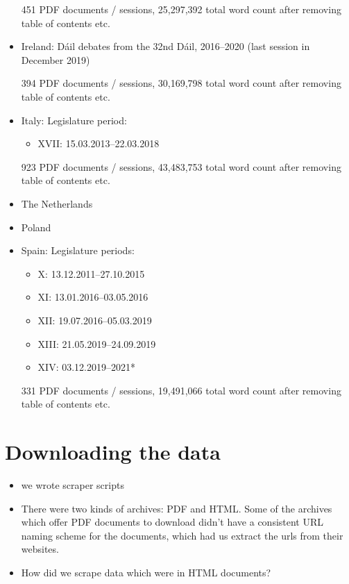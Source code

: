 \documentclass[
  12pt,
]{scrreprt}
\providecommand{\tightlist}{%
  \setlength{\itemsep}{0pt}\setlength{\parskip}{0pt}}
\begin{document}
\begin{itemize}
  451 PDF documents / sessions, 25,297,392 total word count after
  removing table of contents etc.
\item
  Ireland: Dáil debates from the 32nd Dáil, 2016--2020 (last session in
  December 2019)

  394 PDF documents / sessions, 30,169,798 total word count after
  removing table of contents etc.
\item
  Italy: Legislature period:

  \begin{itemize}
  \tightlist
  \item
    XVII: 15.03.2013--22.03.2018
  \end{itemize}

  923 PDF documents / sessions, 43,483,753 total word count after
  removing table of contents etc.
\item
  The Netherlands
\item
  Poland
\item
  Spain: Legislature periods:

  \begin{itemize}
  \tightlist
  \item
    X: 13.12.2011--27.10.2015
  \item
    XI: 13.01.2016--03.05.2016
  \item
    XII: 19.07.2016--05.03.2019
  \item
    XIII: 21.05.2019--24.09.2019
  \item
    XIV: 03.12.2019--2021*
  \end{itemize}

  331 PDF documents / sessions, 19,491,066 total word count after
  removing table of contents etc.
\end{itemize}

\hypertarget{downloading-the-data}{%
\section{Downloading the data}\label{downloading-the-data}}

\begin{itemize}
\tightlist
\item
  we wrote scraper scripts
\item
  There were two kinds of archives: PDF and HTML. Some of the archives
  which offer PDF documents to download didn't have a consistent URL
  naming scheme for the documents, which had us extract the urls from
  their websites.
\item
  How did we scrape data which were in HTML documents?
\end{itemize}
\end{document}
